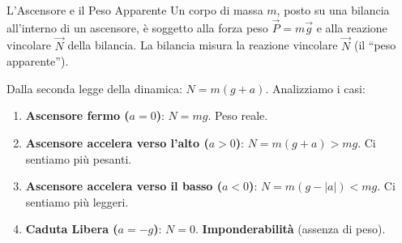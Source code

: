 \begin{esercizio}{L'Ascensore e il Peso Apparente}
Un corpo di massa $m$, posto su una bilancia all'interno di un ascensore, è soggetto alla forza peso $\vec{P} = m\vec{g}$ e alla reazione vincolare $\vec{N}$ della bilancia. La bilancia misura la reazione vincolare $\vec{N}$ (il ``peso apparente'').

Dalla seconda legge della dinamica: $N = m(g + a)$. Analizziamo i casi:
\begin{enumerate}
    \item \textbf{Ascensore fermo ($a=0$)}: $N = mg$. Peso reale.
    \item \textbf{Ascensore accelera verso l'alto ($a > 0$)}: $N = m(g + a) > mg$. Ci sentiamo più pesanti.
    \item \textbf{Ascensore accelera verso il basso ($a < 0$)}: $N = m(g - |a|) < mg$. Ci sentiamo più leggeri.
    \item \textbf{Caduta Libera ($a = -g$)}: $N = 0$. \textbf{Imponderabilità} (assenza di peso).
\end{enumerate}


\end{esercizio}

